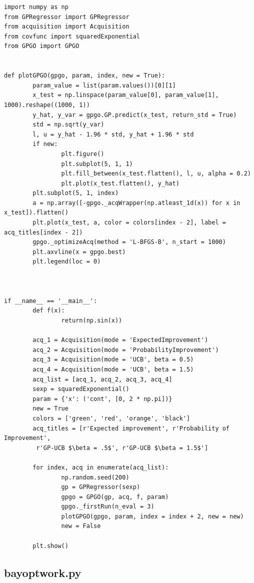 \documentclass[10pt,a4paper,twoside]{book}
\begin{document}
\begin{verbatim}
import numpy as np
from GPRegressor import GPRegressor
from acquisition import Acquisition
from covfunc import squaredExponential
from GPGO import GPGO


def plotGPGO(gpgo, param, index, new = True):
        param_value = list(param.values())[0][1]
        x_test = np.linspace(param_value[0], param_value[1], 1000).reshape((1000, 1))
        y_hat, y_var = gpgo.GP.predict(x_test, return_std = True)
        std = np.sqrt(y_var)
        l, u = y_hat - 1.96 * std, y_hat + 1.96 * std
        if new:
                plt.figure()
                plt.subplot(5, 1, 1)
                plt.fill_between(x_test.flatten(), l, u, alpha = 0.2)
                plt.plot(x_test.flatten(), y_hat)
        plt.subplot(5, 1, index)
        a = np.array([-gpgo._acqWrapper(np.atleast_1d(x)) for x in x_test]).flatten()
        plt.plot(x_test, a, color = colors[index - 2], label = acq_titles[index - 2])
        gpgo._optimizeAcq(method = 'L-BFGS-B', n_start = 1000)
        plt.axvline(x = gpgo.best)
        plt.legend(loc = 0)
        


if __name__ == '__main__':
        def f(x):
                return(np.sin(x))

        acq_1 = Acquisition(mode = 'ExpectedImprovement')
        acq_2 = Acquisition(mode = 'ProbabilityImprovement')
        acq_3 = Acquisition(mode = 'UCB', beta = 0.5)
        acq_4 = Acquisition(mode = 'UCB', beta = 1.5)
        acq_list = [acq_1, acq_2, acq_3, acq_4]
        sexp = squaredExponential()
        param = {'x': ('cont', [0, 2 * np.pi])}
        new = True
        colors = ['green', 'red', 'orange', 'black']
        acq_titles = [r'Expected improvement', r'Probability of Improvement',
         r'GP-UCB $\beta = .5$', r'GP-UCB $\beta = 1.5$']

        for index, acq in enumerate(acq_list):
                np.random.seed(200)
                gp = GPRegressor(sexp)
                gpgo = GPGO(gp, acq, f, param)
                gpgo._firstRun(n_eval = 3)
                plotGPGO(gpgo, param, index = index + 2, new = new)
                new = False

        plt.show()                  
\end{verbatim}

\subsection*{bayoptwork.py}
\end{document}
